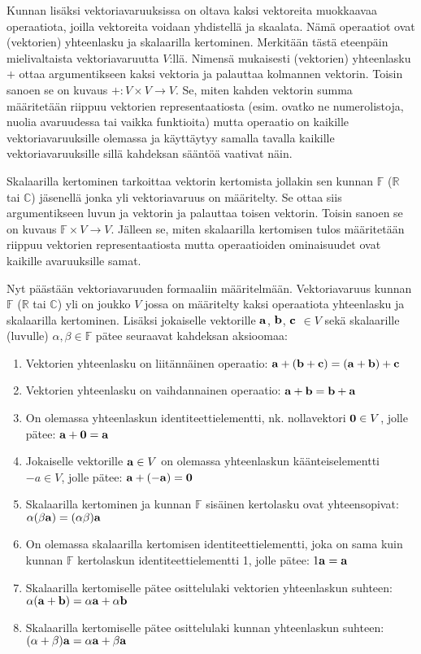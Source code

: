 \documentclass[../johdoksia.tex]{subfiles}
\begin{document}
	Kunnan lisäksi vektoriavaruuksissa on oltava kaksi vektoreita muokkaavaa operaatiota, joilla vektoreita voidaan yhdistellä ja skaalata. Nämä operaatiot ovat (vektorien) yhteenlasku ja skalaarilla kertominen. Merkitään tästä eteenpäin mielivaltaista vektoriavaruutta $V$:llä. Nimensä mukaisesti (vektorien) yhteenlasku $+$ ottaa argumentikseen kaksi vektoria ja palauttaa kolmannen vektorin. Toisin sanoen se on kuvaus $+: V \times V \to V$. Se, miten kahden vektorin summa määritetään riippuu vektorien representaatiosta (esim. ovatko ne numerolistoja, nuolia avaruudessa tai vaikka funktioita) mutta operaatio on kaikille vektoriavaruuksille olemassa ja käyttäytyy samalla tavalla kaikille vektoriavaruuksille sillä kahdeksan sääntöä vaativat näin.
	
	Skalaarilla kertominen tarkoittaa vektorin kertomista jollakin sen kunnan $\mathbb{F}$ ($\mathbb{R}$ tai $\mathbb{C}$) jäsenellä jonka yli vektoriavaruus on määritelty. Se ottaa siis argumentikseen luvun ja vektorin ja palauttaa toisen vektorin. Toisin sanoen se on kuvaus $\mathbb{F} \times V \to V$. Jälleen se, miten skalaarilla kertomisen tulos määritetään riippuu vektorien representaatiosta mutta operaatioiden ominaisuudet ovat kaikille avaruuksille samat.
	
	Nyt päästään vektoriavaruuden formaaliin määritelmään. Vektoriavaruus kunnan $\mathbb{F}$ ($\mathbb{R}$ tai $\mathbb{C}$) yli on joukko $V$ jossa on määritelty kaksi operaatiota yhteenlasku ja skalaarilla kertominen. Lisäksi jokaiselle vektorille $\mathbf{a}$, $\mathbf{b}$, $\mathbf{c}$ $\in V$ sekä skalaarille (luvulle) $\alpha, \beta \in \mathbb{F}$ pätee seuraavat kahdeksan aksioomaa:
	
	\begin{enumerate}
		\item Vektorien yhteenlasku on liitännäinen operaatio: $\mathbf{a} + (\mathbf{b} + \mathbf{c}) = (\mathbf{a} + \mathbf{b}) + \mathbf{c}$
		\item Vektorien yhteenlasku on vaihdannainen operaatio: $\mathbf{a} + \mathbf{b} = \mathbf{b} + \mathbf{a}$
		\item On olemassa yhteenlaskun identiteettielementti, nk. nollavektori $\mathbf{0} \in V$, jolle pätee: $\mathbf{a} + \mathbf{0} = \mathbf{a}$
		\item Jokaiselle vektorille $\mathbf{a} \in V$ on olemassa yhteenlaskun käänteiselementti $-a \in V$, jolle pätee: $\mathbf{a} + (-\mathbf{a}) = \mathbf{0}$
		\item Skalaarilla kertominen ja kunnan $\mathbb{F}$ sisäinen kertolasku ovat yhteensopivat: $\alpha(\beta\mathbf{a}) = (\alpha\beta)\mathbf{a}$
		\item On olemassa skalaarilla kertomisen identiteettielementti, joka on sama kuin kunnan $\mathbb{F}$ kertolaskun identiteettielementti 1, jolle pätee: $1\mathbf{a} = \mathbf{a}$
		\item Skalaarilla kertomiselle pätee osittelulaki vektorien yhteenlaskun suhteen: $\alpha(\mathbf{a} + \mathbf{b}) = \alpha\mathbf{a} + \alpha\mathbf{b}$
		\item Skalaarilla kertomiselle pätee osittelulaki kunnan yhteenlaskun suhteen: $(\alpha + \beta)\mathbf{a} = \alpha\mathbf{a} + \beta\mathbf{a}$
	\end{enumerate}
	
\end{document}

